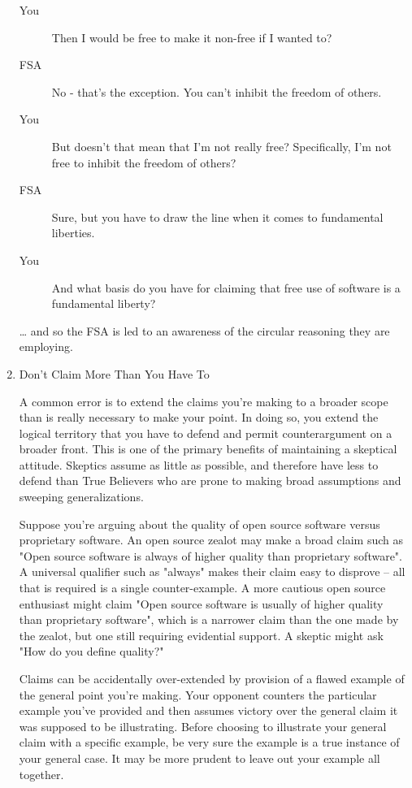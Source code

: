 \documentclass{article}
\begin{document}
\begin{enumerate}
\begin{description}
\item[{You}] Then I would be free to make it non-free if I wanted to?
\item[{FSA}] No - that's the exception. You can't inhibit the freedom of
others.
\item[{You}] But doesn't that mean that I'm not really free? Specifically,
I'm not free to inhibit the freedom of others?
\item[{FSA}] Sure, but you have to draw the line when it comes to
fundamental liberties.
\item[{You}] And what basis do you have for claiming that free use of
software is a fundamental liberty?
\end{description}

\ldots{} and so the FSA is led to an awareness of the circular reasoning they
are employing.

\item Don't Claim More Than You Have To
\label{sec:orgheadline84}

A common error is to extend the claims you're making to a broader scope
than is really necessary to make your point. In doing so, you extend the
logical territory that you have to defend and permit counterargument on
a broader front. This is one of the primary benefits of maintaining a
skeptical attitude. Skeptics assume as little as possible, and therefore
have less to defend than True Believers who are prone to making broad
assumptions and sweeping generalizations.

Suppose you're arguing about the quality of open source software versus
proprietary software. An open source zealot may make a broad claim such
as "Open source software is always of higher quality than proprietary
software". A universal qualifier such as "always" makes their claim easy
to disprove -- all that is required is a single counter-example. A more
cautious open source enthusiast might claim "Open source software is
usually of higher quality than proprietary software", which is a
narrower claim than the one made by the zealot, but one still requiring
evidential support. A skeptic might ask "How do you define quality?"

Claims can be accidentally over-extended by provision of a flawed
example of the general point you're making. Your opponent counters the
particular example you've provided and then assumes victory over the
general claim it was supposed to be illustrating. Before choosing to
illustrate your general claim with a specific example, be very sure the
example is a true instance of your general case. It may be more prudent
to leave out your example all together.


\end{enumerate}
\end{document}

